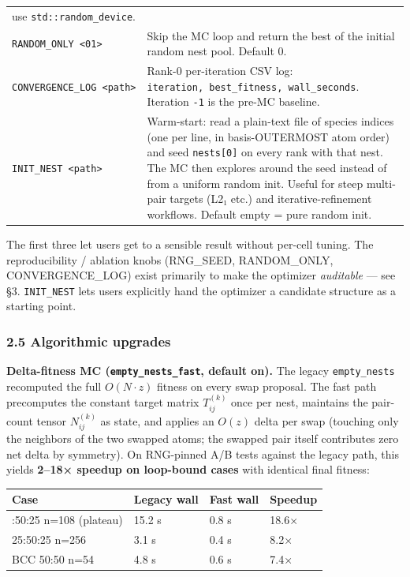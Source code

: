 \documentclass[
  11pt,
]{article}
\begin{document}
\begin{longtable}[]{@{}
  >{\raggedright\arraybackslash}p{}
  >{\raggedright\arraybackslash}p{}@{}}
use \texttt{std::random\_device}. \\
\texttt{RANDOM\_ONLY\ \textless{}0\textbar{}1\textgreater{}} & Skip the
MC loop and return the best of the initial random nest pool. Default
0. \\
\texttt{CONVERGENCE\_LOG\ \textless{}path\textgreater{}} & Rank-0
per-iteration CSV log:
\texttt{iteration,\ best\_fitness,\ wall\_seconds}. Iteration
\texttt{-1} is the pre-MC baseline. \\
\texttt{INIT\_NEST\ \textless{}path\textgreater{}} & Warm-start: read a
plain-text file of species indices (one per line, in basis-OUTERMOST
atom order) and seed \texttt{nests{[}0{]}} on every rank with that nest.
The MC then explores around the seed instead of from a uniform random
init. Useful for steep multi-pair targets (L2₁ etc.) and
iterative-refinement workflows. Default empty = pure random init. \\
\end{longtable}

The first three let users get to a sensible result without per-cell
tuning. The reproducibility / ablation knobs (RNG\_SEED, RANDOM\_ONLY,
CONVERGENCE\_LOG) exist primarily to make the optimizer \emph{auditable}
--- see §3. \texttt{INIT\_NEST} lets users explicitly hand the optimizer
a candidate structure as a starting point.

\subsubsection{2.5 Algorithmic upgrades}\label{algorithmic-upgrades}

\textbf{Delta-fitness MC (\texttt{empty\_nests\_fast}, default on).} The
legacy \texttt{empty\_nests} recomputed the full \(O(N \cdot z)\)
fitness on every swap proposal. The fast path precomputes the constant
target matrix \(T_{ij}^{(k)}\) once per nest, maintains the pair-count
tensor \(N_{ij}^{(k)}\) as state, and applies an \(O(z)\) delta per swap
(touching only the neighbors of the two swapped atoms; the swapped pair
itself contributes zero net delta by symmetry). On RNG-pinned A/B tests
against the legacy path, this yields \textbf{2--18× speedup on
loop-bound cases} with identical final fitness:

\begin{longtable}[]{@{}llll@{}}
\toprule\noalign{}
Case & Legacy wall & Fast wall & Speedup \\
\midrule\noalign{}
\endhead
\bottomrule\noalign{}
\endlastfoot
25:50:25 n=108 (plateau) & 15.2 s & 0.8 s & 18.6× \\
25:50:25 n=256 & 3.1 s & 0.4 s & 8.2× \\
BCC 50:50 n=54 & 4.8 s & 0.6 s & 7.4× \\
\end{longtable}
\end{document}
